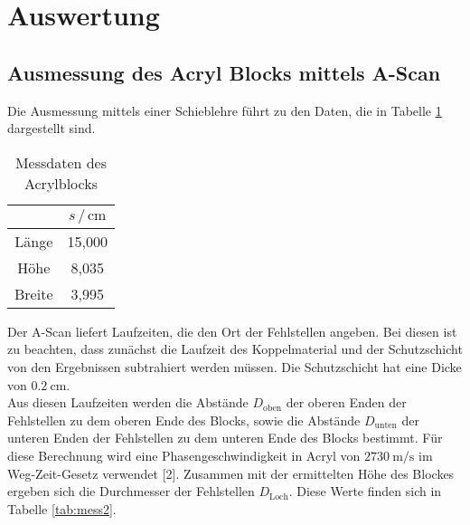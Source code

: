 \section{Auswertung}
\label{sec:Auswertung}

\subsection{Ausmessung des Acryl Blocks mittels A-Scan}

Die Ausmessung mittels einer Schieblehre führt zu den Daten, die in Tabelle \ref{tab:mess1} 
dargestellt sind. 

\begin{table}
  \centering
  \caption{Messdaten des Acrylblocks}
  \label{tab:mess1}
  \begin{tabular}{c c}
  \toprule
  &$s \,/\, \si{\centi\metre}$\\
  \midrule 
  Länge  & 15,000\\
  Höhe   &  8,035\\
  Breite &  3,995\\
  \bottomrule
  \end{tabular}
  \end{table}

Der A-Scan liefert Laufzeiten, die den Ort der Fehlstellen angeben. Bei diesen ist zu beachten, 
dass zunächst die Laufzeit des Koppelmaterial und der Schutzschicht von den Ergebnissen 
subtrahiert werden müssen. Die Schutzschicht hat eine Dicke von $\SI{0.2}{\centi\meter}$. \\
Aus diesen Laufzeiten werden die Abstände $D_\text{oben}$ der oberen Enden der Fehlstellen zu dem oberen Ende des 
Blocks, sowie die Abstände $D_\text{unten}$ der unteren Enden der Fehlstellen zu dem unteren Ende des Blocks 
bestimmt. Für diese Berechnung wird eine Phasengeschwindigkeit in Acryl von $\SI{2730}{\meter\per\second}$ im 
Weg-Zeit-Gesetz verwendet [2]. Zusammen mit der ermittelten Höhe des Blockes ergeben sich die Durchmesser 
der Fehlstellen $D_\text{Loch}$. Diese Werte finden sich in Tabelle \ref{tab:mess2}.

